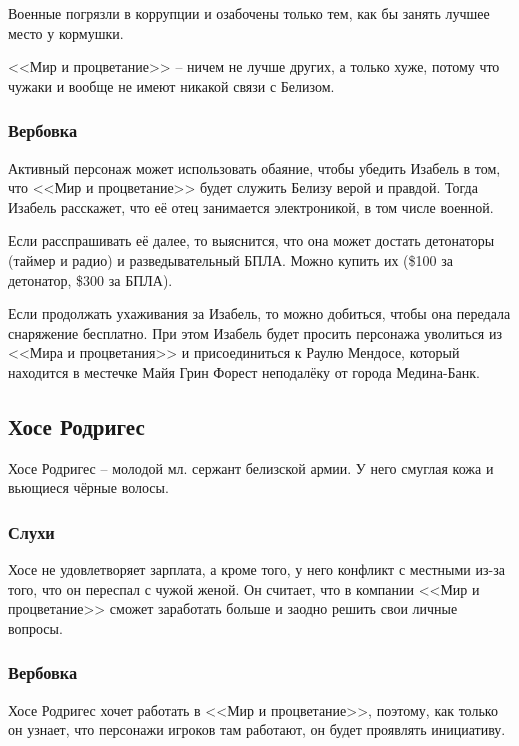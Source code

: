 \documentclass{article}
\begin{document}
Военные погрязли в коррупции и озабочены только тем, как бы занять
лучшее место у кормушки.

<<Мир и процветание>> -- ничем не лучше других, а только хуже, потому что
чужаки и вообще не имеют никакой связи с Белизом.

\subsubsection{Вербовка}\label{recruitment-isabel}

Активный персонаж может использовать обаяние, чтобы убедить Изабель в
том, что <<Мир и процветание>> будет служить Белизу верой и правдой. Тогда
Изабель расскажет, что её отец занимается электроникой, в том числе
военной.

Если расспрашивать её далее, то выяснится, что она может достать
детонаторы (таймер и радио) и разведывательный БПЛА. Можно купить их
(\$100 за детонатор, \$300 за БПЛА).

Если продолжать ухаживания за Изабель, то можно добиться, чтобы она
передала снаряжение бесплатно. При этом Изабель будет просить персонажа
уволиться из <<Мира и процветания>> и присоединиться к Раулю Мендосе,
который находится в местечке Майя Грин Форест неподалёку от города
Медина-Банк.

\subsection{Хосе
Родригес}\label{jose-rodriguez}

Хосе Родригес -- молодой мл. сержант белизской армии. У него смуглая
кожа и вьющиеся чёрные волосы.

\subsubsection{Слухи}\label{rumors-rodriguez}

Хосе не удовлетворяет зарплата, а кроме того, у него конфликт с местными
из-за того, что он переспал с чужой женой. Он считает, что в компании
<<Мир и процветание>> сможет заработать больше и заодно решить свои личные
вопросы.

\subsubsection{Вербовка}\label{recruitment-rodriguez}

Хосе Родригес хочет работать в <<Мир и процветание>>, поэтому, как только
он узнает, что персонажи игроков там работают, он будет проявлять
инициативу.
\end{document}
